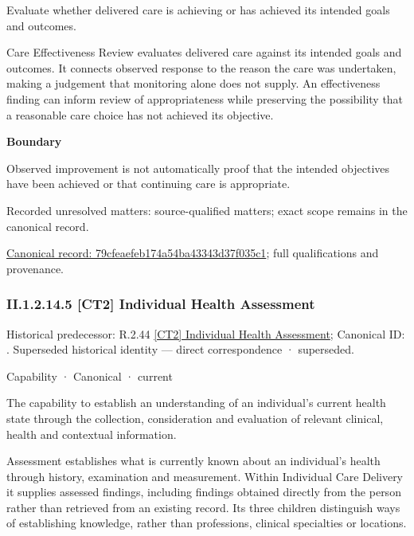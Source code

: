 Evaluate whether delivered care is achieving or has achieved its intended goals and outcomes.



Care Effectiveness Review evaluates delivered care against its intended goals and outcomes. It connects observed response to the reason the care was undertaken, making a judgement that monitoring alone does not supply. An effectiveness finding can inform review of appropriateness while preserving the possibility that a reasonable care choice has not achieved its objective.



\textbf{Boundary}



Observed improvement is not automatically proof that the intended objectives have been achieved or that continuing care is appropriate.


{\small Recorded unresolved matters: source-qualified matters; exact scope remains in the canonical record.}\par
{\footnotesize \href{../../../../../../../continuum/strategy/capability/79cfeaefeb174a54ba43343d37f035c1.md}{Canonical record: 79cfeaefeb174a54ba43343d37f035c1}; full qualifications and provenance.}\par
\subsubsection*{II.1.2.14.5 [CT2] Individual Health Assessment}
\label{navigation:II.1.2.14.5}

{\small Historical predecessor: R.2.44 \hyperref[element:9111446aa2d045bd9acd98542b0eef1f]{[CT2] Individual Health Assessment}; Canonical ID: \texttt{}. Superseded historical identity — direct correspondence · superseded.}\par
\label{element:045f819bb3694d3c9db7f20886e2993f}
{\small Capability · Canonical · current}\par

The capability to establish an understanding of an individual's current health state through the collection, consideration and evaluation of relevant clinical, health and contextual information.



Assessment establishes what is currently known about an individual's health through history, examination and measurement. Within Individual Care Delivery it supplies assessed findings, including findings obtained directly from the person rather than retrieved from an existing record. Its three children distinguish ways of establishing knowledge, rather than professions, clinical specialties or locations.



